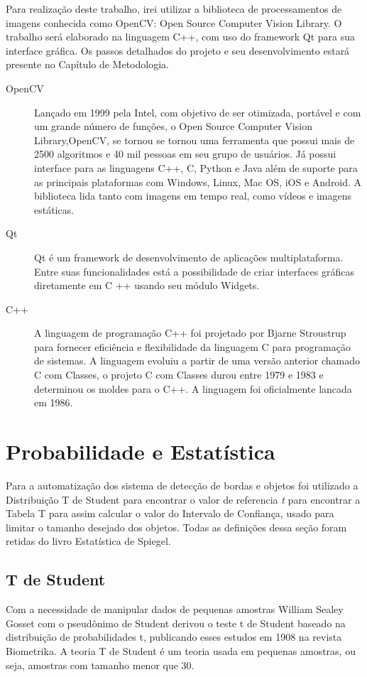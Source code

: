 Para realização deste trabalho, irei utilizar a biblioteca de processamentos de imagens conhecida como OpenCV: Open Source Computer Vision Library. O trabalho será elaborado na linguagem C++, com uso do framework Qt para sua interface gráfica.
Os passos detalhados do projeto e seu desenvolvimento estará presente no Capítulo de Metodologia.
\begin{description}
	\item[OpenCV] Lançado em 1999 pela Intel\cite{Culjak:2012}, com objetivo de ser otimizada, portável e com um grande número de funções, o Open Source Computer Vision Library,OpenCV, se tornou se tornou uma ferramenta que possui mais de 2500 algoritmos e 40 mil pessoas em seu grupo de usuários\cite{Culjak:2012}. Já possui interface para as linguagens C++, C, Python e Java além de suporte para as principais plataformas com Windows, Linux, Mac OS, iOS e Android. A biblioteca lida tanto com imagens em tempo real, como vídeos e imagens estáticas.
	
	\item[Qt] Qt é um framework de desenvolvimento de aplicações multiplataforma. Entre suas funcionalidades está a possibilidade de criar interfaces gráficas diretamente em C ++ usando seu módulo Widgets.
	
	\item [C++] A linguagem de programação C++ foi projetado por Bjarne Stroustrup para fornecer eficiência e flexibilidade da linguagem C para programação de sistemas. A linguagem evoluiu a partir de uma versão anterior chamado C com Classes, o projeto C com Classes durou entre 1979 e 1983 e determinou os moldes para o C++. A linguagem foi oficialmente lancada em 1986.\cite{Stroustrup:1996} 
\end{description}


\section{Probabilidade e Estatística}

Para a automatização dos sistema de detecção de bordas e objetos foi utilizado a Distribuição T de Student para encontrar o valor de referencia \textit{t} para encontrar a Tabela T\cite{TabelaUFF} para assim calcular o valor do Intervalo de Confiança, usado para limitar o tamanho desejado dos objetos.
Todas as definições dessa seção foram retidas do livro Estatística de Spiegel\cite{Spiegel:1974}. 
\subsection{T de Student}
Com a necessidade de manipular dados de pequenas amostras William Sealey Gosset com o pseudônimo de Student derivou o teste t de Student baseado na distribuição de probabilidades t, publicando esses estudos em 1908 na revista Biometrika\cite{UFRN}.
A teoria T de Student é um teoria usada em pequenas amostras, ou seja, amostras com tamanho menor que 30.

